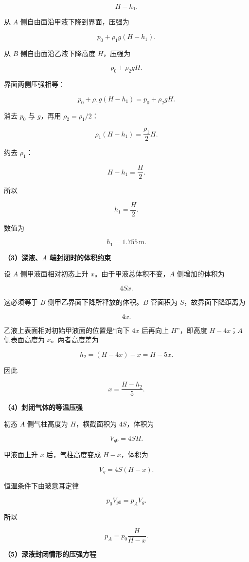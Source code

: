 \documentclass[12pt,a4paper,UTF8]{ctexart}
\begin{document}
\[
H-h_1.
\tag{3}
\]

从 \(A\) 侧自由面沿甲液下降到界面，压强为

\[
p_0+\rho_1g(H-h_1).
\tag{4}
\]

从 \(B\) 侧自由面沿乙液下降高度 \(H\)，压强为

\[
p_0+\rho_2gH.
\tag{5}
\]

界面两侧压强相等：

\[
p_0+\rho_1g(H-h_1)
=p_0+\rho_2gH.
\tag{6}
\]

消去 \(p_0\) 与 \(g\)，再用 \(\rho_2=\rho_1/2\)：

\[
\rho_1(H-h_1)=\frac{\rho_1}{2}H.
\]

约去 \(\rho_1\)：

\[
H-h_1=\frac H2.
\]

所以

\[
\boxed{h_1=\frac H2}.
\tag{7}
\]

数值为

\[
\boxed{h_1=1.755\,\mathrm m}.
\tag{8}
\]

\textbf{（3）深液、\(A\) 端封闭时的体积约束}

设 \(A\) 侧甲液面相对初态上升 \(x\)。由于甲液总体积不变，\(A\)
侧增加的体积为

\[
4Sx.
\]

这必须等于 \(B\) 侧甲乙界面下降所释放的体积。\(B\) 管面积为
\(S\)，故界面下降距离为

\[
4x.
\tag{9}
\]

乙液上表面相对初始甲液面的位置是``向下 \(4x\) 后再向上 \(H\)''，即高度
\(H-4x\)；\(A\) 侧表面高度为 \(x\)。两者高度差为

\[
h_2=(H-4x)-x=H-5x.
\tag{10}
\]

因此

\[
\boxed{x=\frac{H-h_2}{5}}.
\tag{11}
\]

\textbf{（4）封闭气体的等温压强}

初态 \(A\) 侧气柱高度为 \(H\)，横截面积为 \(4S\)，体积为

\[
V_{g0}=4SH.
\tag{12}
\]

甲液面上升 \(x\) 后，气柱高度变成 \(H-x\)，体积为

\[
V_g=4S(H-x).
\tag{13}
\]

恒温条件下由玻意耳定律

\[
p_0V_{g0}=p_AV_g.
\tag{14}
\]

所以

\[
\boxed{
p_A=p_0\frac{H}{H-x}
}.
\tag{15}
\]

\textbf{（5）深液封闭情形的压强方程}
\end{document}
